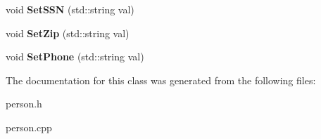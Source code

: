 \begin{DoxyCompactItemize}
\item 
\hypertarget{classperson_add13137925787bacf3b41e1f441d1229}{void {\bfseries Set\-S\-S\-N} (std\-::string val)}\label{d7/db3/classperson_add13137925787bacf3b41e1f441d1229}

\item 
\hypertarget{classperson_a5456f5de42df1b8cfae23b6325caacf6}{void {\bfseries Set\-Zip} (std\-::string val)}\label{d7/db3/classperson_a5456f5de42df1b8cfae23b6325caacf6}

\item 
\hypertarget{classperson_aadbd4c38d5f1f6f49b91ebe816c16575}{void {\bfseries Set\-Phone} (std\-::string val)}\label{d7/db3/classperson_aadbd4c38d5f1f6f49b91ebe816c16575}

\end{DoxyCompactItemize}


The documentation for this class was generated from the following files\-:\begin{DoxyCompactItemize}
\item 
person.\-h\item 
person.\-cpp\end{DoxyCompactItemize}
